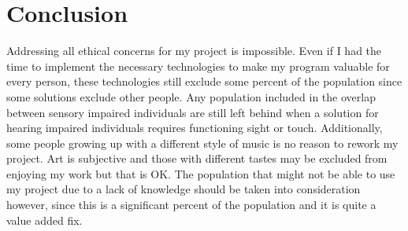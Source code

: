 \documentclass[10pt,twocolumn]{article}
\begin{document}
\section{Conclusion}
    Addressing all ethical concerns for my project is impossible. Even if I had the time to implement the necessary technologies to make my program valuable for every person, these technologies still exclude some percent of the population since some solutions exclude other people. Any population included in the overlap between sensory impaired individuals are still left behind when a solution for hearing impaired individuals requires functioning sight or touch. Additionally, some people growing up with a different style of music is no reason to rework my project. Art is subjective and those with different tastes may be excluded from enjoying my work but that is OK. The population that might not be able to use my project due to a lack of knowledge should be taken into consideration however, since this is a significant percent of the population and it is quite a value added fix.
\printbibliography 
\end{document}
